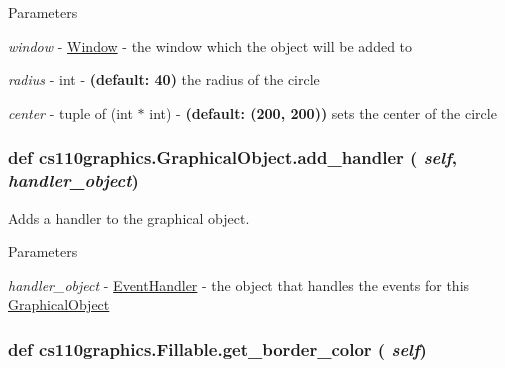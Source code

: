 \begin{DoxyParams}{Parameters}
\item[{\em window}]-\/ \hyperlink{classcs110graphics_1_1Window}{Window} -\/ the window which the object will be added to \item[{\em radius}]-\/ int -\/ {\bfseries (default: 40)} the radius of the circle \item[{\em center}]-\/ tuple of (int $\ast$ int) -\/ {\bfseries (default: (200, 200))} sets the center of the circle \end{DoxyParams}
\hypertarget{classcs110graphics_1_1GraphicalObject_adb1af0d5a6baae3f9a08d21a3227c49f}{
\subsubsection[{add\_\-handler}]{\setlength{\rightskip}{0pt plus 5cm}def cs110graphics.GraphicalObject.add\_\-handler ( {\em self}, \/   {\em handler\_\-object})}}
\label{classcs110graphics_1_1GraphicalObject_adb1af0d5a6baae3f9a08d21a3227c49f}


Adds a handler to the graphical object. 
\begin{DoxyParams}{Parameters}
\item[{\em handler\_\-object}]-\/ \hyperlink{classcs110graphics_1_1EventHandler}{EventHandler} -\/ the object that handles the events for this \hyperlink{classcs110graphics_1_1GraphicalObject}{GraphicalObject} \end{DoxyParams}
\hypertarget{classcs110graphics_1_1Fillable_a6772d56158c9fe98a33f01d47cb8aa41}{
\subsubsection[{get\_\-border\_\-color}]{\setlength{\rightskip}{0pt plus 5cm}def cs110graphics.Fillable.get\_\-border\_\-color ( {\em self})}}
\label{classcs110graphics_1_1Fillable_a6772d56158c9fe98a33f01d47cb8aa41}


